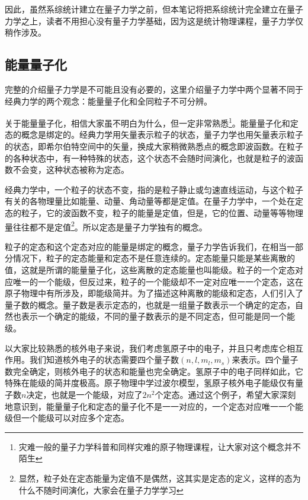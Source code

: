 \documentclass[../../main.tex]{subfiles}
\begin{document}
因此，虽然系综统计建立在量子力学之前，但本笔记将把系综统计完全建立在量子力学之上，读者不用担心没有量子力学基础，因为这是统计物理课程，量子力学仅稍作涉及。

\subsection{能量量子化}
完整的介绍量子力学是不可能且没有必要的，这里介绍量子力学中两个显著不同于经典力学的两个观念：能量量子化和全同粒子不可分辨。

关于能量量子化，相信大家虽不明白为什么，但一定非常熟悉\footnote{灾难一般的量子力学科普和同样灾难的原子物理课程，让大家对这个概念并不陌生}。能量量子化和定态的概念是绑定的。经典力学用矢量表示粒子的状态，量子力学也用矢量表示粒子的状态，即希尔伯特空间中的矢量，换成大家稍微熟悉点的概念即波函数。在粒子的各种状态中，有一种特殊的状态，这个状态不会随时间演化，也就是粒子的波函数不会变，这种状态被称为定态。

经典力学中，一个粒子的状态不变，指的是粒子静止或匀速直线运动，与这个粒子有关的各物理量比如能量、动量、角动量等都是定值。在量子力学中，一个处在定态的粒子，它的波函数不变，粒子的能量是定值，但是，它的位置、动量等等物理量往往都不是定值\footnote{显然，粒子处在定态能量为定值不是偶然，这其实是定态的定义，这样的态为什么不随时间演化，大家会在量子力学学习}。所以定态是量子力学独有的概念。

粒子的定态和这个定态对应的能量是绑定的概念，量子力学告诉我们，在相当一部分情况下，粒子的定态能量和定态不是任意连续的。定态能量只能是某些离散的值，这就是所谓的能量量子化，这些离散的定态能量也叫能级。粒子的一个定态对应唯一的一个能级，但反过来，粒子的一个能级却不一定对应唯一一个定态，这在原子物理中有所涉及，即能级简并。为了描述这种离散的能级和定态，人们引入了量子数的概念。量子数是表示定态的，也就是一组量子数表示一个确定的定态，自然也表示一个确定的能级，不同的量子数表示的是不同定态，但可能是同一个能级。

以大家比较熟悉的核外电子来说，我们考虑氢原子中的电子，并且只考虑库仑相互作用。我们知道核外电子的状态需要四个量子数\((n,l,m_l,m_s)\)来表示。四个量子数完全确定，则核外电子的状态和能量也完全确定。氢原子中的电子同样如此，它特殊在能级的简并度极高。原子物理中学过波尔模型，氢原子核外电子能级仅有量子数\(n\)决定，也就是一个能级，对应了\(2n^2\)个定态。通过这个例子，希望大家深刻地意识到，能量量子化和定态的量子化不是一一对应的，一个定态对应唯一一个能级但一个能级可以对应多个定态。
\end{document}
